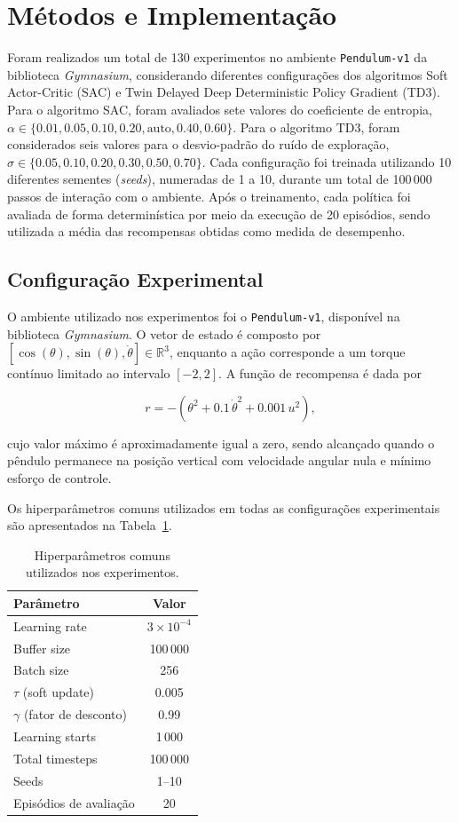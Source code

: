 \documentclass{Supervised_Reinforcement_Learningqsport}
\begin{document}
\section{Métodos e Implementação}
Foram realizados um total de 130 experimentos no ambiente \texttt{Pendulum-v1} da biblioteca \textit{Gymnasium}, considerando diferentes configurações dos algoritmos Soft Actor-Critic (SAC) e Twin Delayed Deep Deterministic Policy Gradient (TD3). Para o algoritmo SAC, foram avaliados sete valores do coeficiente de entropia, $\alpha \in \{0.01, 0.05, 0.10, 0.20, \text{auto}, 0.40, 0.60\}$. Para o algoritmo TD3, foram considerados seis valores para o desvio-padrão do ruído de exploração, $\sigma \in \{0.05, 0.10, 0.20, 0.30, 0.50, 0.70\}$. Cada configuração foi treinada utilizando 10 diferentes sementes (\textit{seeds}), numeradas de 1 a 10, durante um total de 100\,000 passos de interação com o ambiente. Após o treinamento, cada política foi avaliada de forma determinística por meio da execução de 20 episódios, sendo utilizada a média das recompensas obtidas como medida de desempenho.

\subsection{Configuração Experimental}

O ambiente utilizado nos experimentos foi o \texttt{Pendulum-v1}, disponível na biblioteca \textit{Gymnasium}. O vetor de estado é composto por
$\left[\cos(\theta), \sin(\theta), \dot{\theta}\right] \in \mathbb{R}^{3}$,
enquanto a ação corresponde a um torque contínuo limitado ao intervalo
$[-2,2]$. A função de recompensa é dada por

\[
r = -\left(\theta^{2} + 0.1\,\dot{\theta}^{2} + 0.001\,u^{2}\right),
\]

cujo valor máximo é aproximadamente igual a zero, sendo alcançado quando o pêndulo permanece na posição vertical com velocidade angular nula e mínimo esforço de controle.

Os hiperparâmetros comuns utilizados em todas as configurações experimentais são apresentados na Tabela~\ref{tab:hiperparametros}.

\begin{table}[ht]
\centering
\caption{Hiperparâmetros comuns utilizados nos experimentos.}
\label{tab:hiperparametros}
\begin{tabular}{lc}
\hline
\textbf{Parâmetro} & \textbf{Valor} \\
\hline
Learning rate & $3 \times 10^{-4}$ \\
Buffer size & 100\,000 \\
Batch size & 256 \\
$\tau$ (soft update) & 0.005 \\
$\gamma$ (fator de desconto) & 0.99 \\
Learning starts & 1\,000 \\
Total timesteps & 100\,000 \\
Seeds & 1--10 \\
Episódios de avaliação & 20 \\
\hline
\end{tabular}
\end{table}
\end{document}
